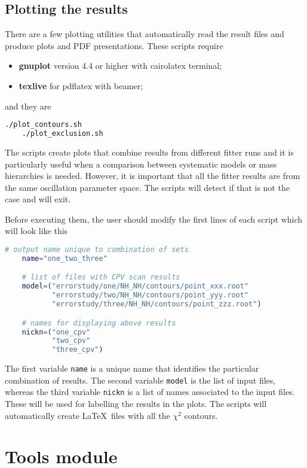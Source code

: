 \documentclass[a4paper, 11pt]{article}
\begin{document}
\subsection{Plotting the results}
\label{sec:plot}

There are a few plotting utilities that automatically read the result files %
and produce plots and PDF presentations.
These scripts require
\begin{itemize}
		\small
	\item \textbf{gnuplot} version 4.4 or higher with cairolatex terminal;
	\item \textbf{texlive} for pdflatex with beamer;
\end{itemize}
and they are
\begin{lstlisting}[language=bash]
	./plot_contours.sh
	./plot_exclusion.sh
\end{lstlisting}
The scripts create plots that combine results from different fitter runs and it is particularly useful %
when a comparison between systematic models or mass hierarchies is needed.
However, it is important that all the fitter results are from the same oscillation parameter space.
The scripts will detect if that is not the case and will exit.

Before executing them, the user should modify the first lines of each script which will look like this
\begin{lstlisting}[language=bash]
	# output name unique to combination of sets
	name="one_two_three"

	# list of files with CPV scan results
	model=("errorstudy/one/NH_NH/contours/point_xxx.root"
	       "errorstudy/two/NH_NH/contours/point_yyy.root"
	       "errorstudy/three/NH_NH/contours/point_zzz.root")

	# names for displaying above results
	nickn=("one_cpv"
	       "two_cpv"
	       "three_cpv")
\end{lstlisting}
The first variable \texttt{name} is a unique name that identifies the particular combination of results.
The second variable \texttt{model} is the list of input files, whereas the third variable \texttt{nickn} %
is a list of names associated to the input files.
These will be used for labelling the results in the plots.
The scripts will automatically create \LaTeX\ files with all the $\chi^2$ contours. 


\section{Tools module}
\end{document}
